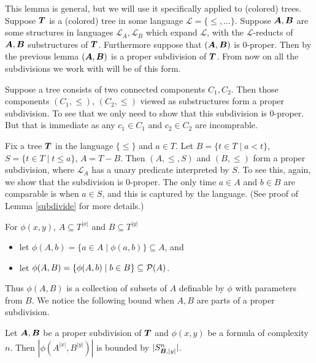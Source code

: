 \documentclass{amsart}
\DeclareMathOperator{\TT}{\boldface T}
\DeclareMathOperator{\A}{\boldface A}
\DeclareMathOperator{\B}{\boldface B}
\renewcommand{\LL}{\mathcal L}
\begin{document}
This lemma is general, but we will use it specifically applied to (colored) trees.
Suppose $\TT$ is a (colored) tree in some language $\LL = \{\leq, \ldots\}$.
Suppose $\A, \B$ are some structures in languages $\LL_A, \LL_B$ which expand $\LL$, with the $\LL$-reducts of $\A, \B$ substructures of $\TT$.
Furthermore suppose that $(\A, \B)$ is 0-proper.
Then by the previous lemma $(\A, \B)$ is a proper subdivision of $\TT$.
From now on all the subdivisions we work with will be of this form.

\begin{Example} \label{ex_disc}
  Suppose a tree consists of two connected components $C_1, C_2$.
  Then those components $(C_1, \leq)$, $(C_2, \leq)$ viewed as substructures form a proper subdivision.
  To see that we only need to show that this subdivision is 0-proper.
  But that is immediate as any $c_1 \in C_1$ and $c_2 \in C_2$ are incomprable.
\end{Example}

\begin{Example} \label{ex_cone}
	Fix a tree $\TT$ in the language $\{\leq\}$ and $a \in T$. Let $B = \{t \in T \mid a < t\}$, $S = \{t \in T \mid t \leq a\}$, $A = T - B$. Then $(A, \leq, S)$ and $(B, \leq)$ form a proper subdivision, where $\LL_A$ has a unary predicate interpreted by $S$.
To see this, again, we show that the subdivision is 0-proper.
The only time $a \in A$ and $b \in B$ are comparable is when $a \in S$, and this is captured by the language.
(See proof of Lemma \ref{subdivide} for more details.)
\end{Example}

\begin{Definition} For $\phi(x, y)$, $A \subseteq T^{|x|}$ and $B \subseteq T^{|y|}$
\begin{itemize}
	\item let $\phi(A, b) = \{a \in A \mid \phi(a, b)\} \subseteq A$, and 
	\item let $\phi(A, B) = \{\phi(A, b) \mid b \in B\} \subseteq \mathcal P(A)$.	
\end{itemize}
\end{Definition}
Thus $\phi(A, B)$ is a collection of subsets of $A$ definable by $\phi$ with parameters from $B$. We notice the following bound when $A, B$ are parts of a proper subdivision.

\begin{Corollary} \label{cor_type_count}
	Let $\A, \B$ be a proper subdivision of $\TT$ and $\phi(x,y)$ be a formula of complexity $n$. Then $|\phi(A^{|x|}, B^{|y|})|$ is bounded by $|S^n_{\B, |y|}|$.
\end{Corollary}
\end{document}
